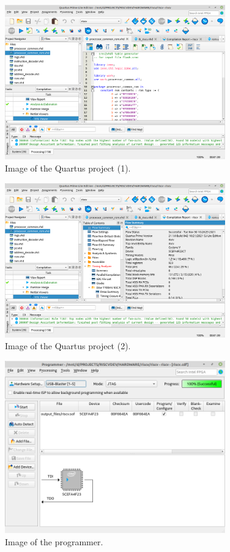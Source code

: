 \documentclass[12pt]{article}
\begin{document}
\begin{itemize}
\begin{figure}[!ht]
\centering
\includegraphics[width=0.85\textwidth]{quartus1}
\caption{Image of the Quartus project (1).}
\label{quartus1}
\end{figure}

\begin{figure}[!ht]
\centering
\includegraphics[width=0.85\textwidth]{quartus2}
\caption{Image of the Quartus project (2).}
\label{quartus2}
\end{figure}

\begin{figure}[!ht]
\centering
\includegraphics[width=0.85\textwidth]{programmer}
\caption{Image of the programmer.}
\label{programmer}
\end{figure}

\end{itemize}
\end{document}
